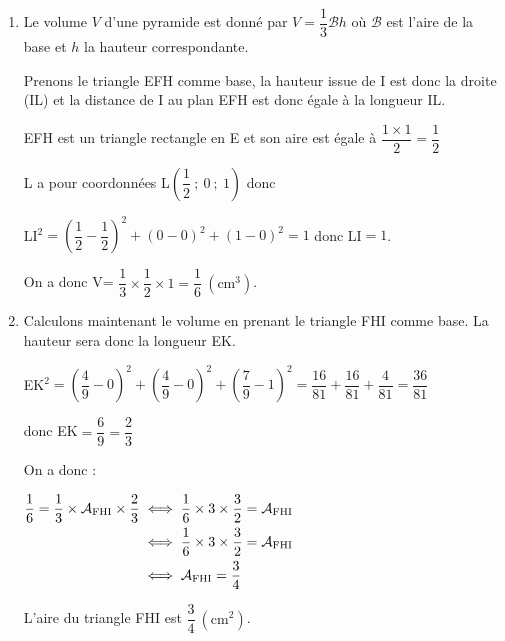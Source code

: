 \begin{enumerate}
\begin{enumerate}
		Ses coordonnées vérifient :

		$x_\mathrm{K}=\dfrac{4}{9}$, \quad $y_\mathrm{K}=\dfrac{4}{9}$ \quad et \quad $z_\mathrm{K}=1- \dfrac{1}{2} \times \dfrac{4}{9}=1-\dfrac{2}{9}=\dfrac{7}{9}$.

		Le projeté orthogonal  du point E sur le plan (FHI) est le point K de coordonnées K$\left( \dfrac{4}{9} ~;~  \dfrac{4}{9} ~;~ \dfrac{7}{9} \right)$.


		\item  Le volume $V$ d'une pyramide est donné par  $V=\dfrac{1}{3}\mathcal{B}h$  où  $\mathcal{B}$ est l'aire de la base et $h$ la hauteur correspondante.

		Prenons le triangle EFH comme base, la hauteur issue de  I est donc la droite (IL) et la distance de I au plan EFH est donc égale à la longueur IL.

		EFH est un triangle rectangle en E et son aire est égale à $\dfrac{ 1\times 1}{2}=\dfrac{1}{2}$

		L a pour coordonnées  L$\left(\dfrac{1}{2}~;~ 0~;~1 \right)$   donc

		LI$^2= \left( \dfrac{1}{2} -\dfrac{1}{2}   \right)^2 + (0-0)^2 + (1-0)^2= 1 $ donc LI$=1$.

		On a donc V= $\dfrac{1}{3} \times \dfrac{1}{2} \times 1 = \dfrac{1}{6}~\left(\text{cm}^3\right)$.


		\item  Calculons maintenant le volume en prenant le triangle FHI comme base. La hauteur sera donc la longueur EK.

		EK$^2=    \left( \dfrac{4}{9} -0   \right)^2 + \left( \dfrac{4}{9} -0  \right)^2 + \left( \dfrac{7}{9} -1  \right)^2  = \dfrac{16}{81}+ \dfrac{16}{81}+\dfrac{4}{81}  = \dfrac{36}{81}$

		donc EK$=\dfrac{6}{9}=\dfrac{2}{3}$

		On a donc :

		$\aligned[t] \dfrac{1}{6}=\dfrac{1}{3}\times \mathcal{A}_{\mathrm{FHI}}\times \dfrac{2}{3}
		&\iff \dfrac{1}{6} \times 3 \times\dfrac{3}{2} =  \mathcal{A}_{\mathrm{FHI}} \\
		&\iff \dfrac{1}{6} \times 3 \times\dfrac{3}{2} =  \mathcal{A}_{\mathrm{FHI}} \\
		&\iff  \mathcal{A}_{\mathrm{FHI}}=\dfrac{3}{4}\endaligned$


		L'aire du triangle FHI est	$ \dfrac{3}{4}~\left(\text{cm}^2\right)$.
	\end{enumerate}
\end{enumerate}

\bigskip

